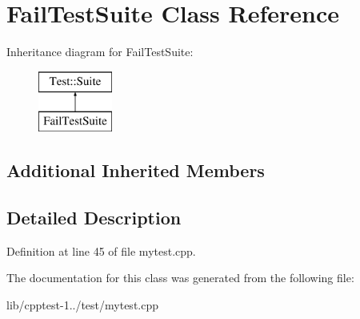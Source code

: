 \hypertarget{class_fail_test_suite}{}\section{Fail\+Test\+Suite Class Reference}
\label{class_fail_test_suite}
Inheritance diagram for Fail\+Test\+Suite\+:\begin{figure}[H]
\begin{center}
\leavevmode
\includegraphics[height=2.000000cm]{class_fail_test_suite}
\end{center}
\end{figure}
\subsection*{Additional Inherited Members}


\subsection{Detailed Description}


Definition at line 45 of file mytest.\+cpp.



The documentation for this class was generated from the following file\+:\begin{DoxyCompactItemize}
\item 
lib/cpptest-\/1../test/mytest.\+cpp\end{DoxyCompactItemize}
